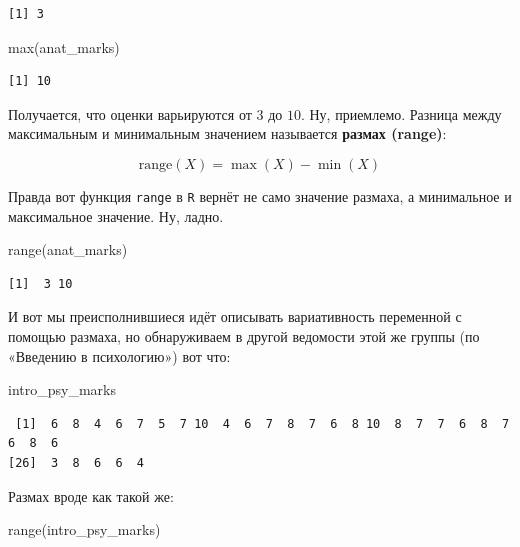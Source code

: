 \documentclass[
  letterpaper,
  DIV=11,
  numbers=noendperiod]{scrreprt}
\newenvironment{Shaded}{}{}
\newcommand{\FunctionTok}[1]{\textcolor[rgb]{0.44,0.26,0.76}{#1}}
\newcommand{\NormalTok}[1]{\textcolor[rgb]{0.14,0.16,0.18}{#1}}
\theoremstyle{definition}
\theoremstyle{remark}
\begin{document}
\begin{verbatim}
[1] 3
\end{verbatim}

\begin{Shaded}
\begin{Highlighting}[]
\FunctionTok{max}\NormalTok{(anat\_marks)}
\end{Highlighting}
\end{Shaded}

\begin{verbatim}
[1] 10
\end{verbatim}

Получается, что оценки варьируются от \(3\) до \(10\). Ну, приемлемо.
Разница между максимальным и минимальным значением называется
\textbf{размах (range)}:

\[
\mathrm{range}(X) = \max(X) - \min(X)
\]

Правда вот функция \texttt{range} в \texttt{R} вернёт не само значение
размаха, а минимальное и максимальное значение. Ну, ладно.

\begin{Shaded}
\begin{Highlighting}[]
\FunctionTok{range}\NormalTok{(anat\_marks)}
\end{Highlighting}
\end{Shaded}

\begin{verbatim}
[1]  3 10
\end{verbatim}

И вот мы преисполнившиеся идёт описывать вариативность переменной с
помощью размаха, но обнаруживаем в другой ведомости этой же группы (по
«Введению в психологию») вот что:

\begin{Shaded}
\begin{Highlighting}[]
\NormalTok{intro\_psy\_marks}
\end{Highlighting}
\end{Shaded}

\begin{verbatim}
 [1]  6  8  4  6  7  5  7 10  4  6  7  8  7  6  8 10  8  7  7  6  8  7  6  8  6
[26]  3  8  6  6  4
\end{verbatim}

Размах вроде как такой же:

\begin{Shaded}
\begin{Highlighting}[]
\FunctionTok{range}\NormalTok{(intro\_psy\_marks)}
\end{Highlighting}
\end{Shaded}
\end{document}
